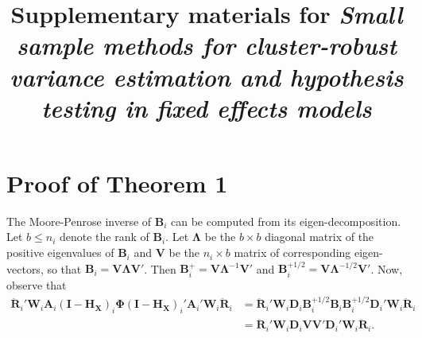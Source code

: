 \documentclass{article}\usepackage[]{graphicx}\usepackage[]{color}
\title{Supplementary materials for \textit{Small sample methods for cluster-robust variance estimation and hypothesis testing in fixed effects models}}
\newcommand{\bm}{\mathbf}
\newcommand{\bs}{\boldsymbol}
\begin{document}
\maketitle
\tableofcontents

\newpage
\section{Proof of Theorem 1}

The Moore-Penrose inverse of $\bm{B}_i$ can be computed from its eigen-decomposition. Let $b \leq n_i$ denote the rank of $\bm{B}_i$. 
Let $\bs\Lambda$ be the $b \times b$ diagonal matrix of the positive eigenvalues of $\bm{B}_i$ and $\bm{V}$ be the $n_i \times b$ matrix of corresponding eigen-vectors, so that $\bm{B}_i = \bm{V}\bs\Lambda\bm{V}'$. 
Then $\bm{B}_i^+ = \bm{V}\bs\Lambda^{-1}\bm{V}'$ and $\bm{B}_i^{+1/2} = \bm{V}\bs\Lambda^{-1/2}\bm{V}'$. Now, observe that 
\begin{equation}\begin{aligned}
\label{eq:step1}
\bm{\ddot{R}}_i' \bm{W}_i \bm{A}_i \left(\bm{I} - \bm{H_X}\right)_i \bs\Phi \left(\bm{I} - \bm{H_X}\right)_i' \bm{A}_i' \bm{W}_i \bm{\ddot{R}}_i &= \bm{\ddot{R}}_i' \bm{W}_i \bm{D}_i \bm{B}_i^{+1/2} \bm{B}_i \bm{B}_i^{+1/2} \bm{D}_i' \bm{W}_i \bm{\ddot{R}}_i \\
&= \bm{\ddot{R}}_i' \bm{W}_i \bm{D}_i \bm{V}\bm{V}' \bm{D}_i' \bm{W}_i \bm{\ddot{R}}_i. 
\end{aligned}\end{equation}
\end{document}
